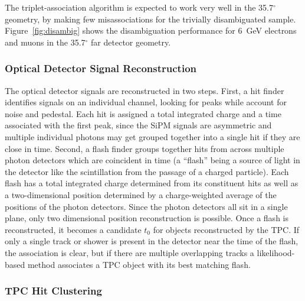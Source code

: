The triplet-association algorithm is expected to work very well in the
35.7$^\circ$ geometry, by making few misassociations for the trivially
disambiguated sample.  Figure~\ref{fig:disambig} shows the
disambiguation performance for 6~GeV electrons and muons in the
35.7$^\circ$ far detector geometry.

\subsubsection{Optical Detector Signal Reconstruction}

The optical detector signals are reconstructed in two steps.  First, a
hit finder identifies signals on an individual channel, looking for
peaks while account for noise and pedestal.  Each hit is assigned a
total integrated charge and a time associated with the first peak,
since the SiPM signals are asymmetric and multiple individual photons
may get grouped together into a single hit if they are close in time.
Second, a flash finder groups together hits from across multiple
photon detectors which are coincident in time (a ``flash'' being a
source of light in the detector like the scintillation from the
passage of a charged particle).  Each flash has a total integrated
charge determined from its constituent hits as well as a
two-dimensional position determined by a charge-weighted average of
the positions of the photon detectors.  Since the photon detectors all
sit in a single plane, only two dimensional position reconstruction is
possible.  Once a flash is reconstructed, it becomes a candidate $t_0$
for objects reconstructed by the TPC.  If only a single track or
shower is present in the detector near the time of the flash, the
association is clear, but if there are multiple overlapping tracks a
likelihood-based method associates a TPC object with its best matching
flash.



\subsubsection{TPC Hit Clustering}


